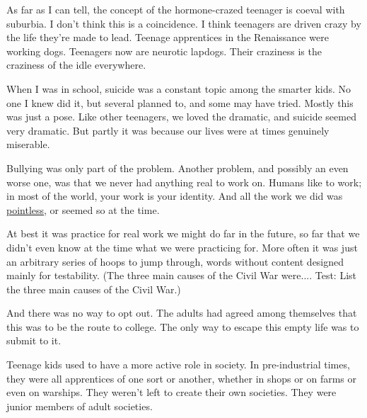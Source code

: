 As far as I can tell, the concept of
                  the hormone-crazed teenager is coeval with suburbia. I don't
                  think this is a coincidence. I think teenagers are driven
                  crazy by the life they're made to lead. Teenage apprentices in
                  the Renaissance were working dogs. Teenagers now are neurotic
                  lapdogs. Their craziness is the craziness of the idle
                  everywhere.




                  When I was in school, suicide was a constant topic among the
                  smarter kids. No one I knew did it, but several planned to,
                  and some may have tried. Mostly this was just a pose. Like
                  other teenagers, we loved the dramatic, and suicide seemed
                  very dramatic. But partly it was because our lives were at
                  times genuinely miserable.

Bullying was only part
                  of the problem. Another problem, and possibly an even worse
                  one, was that we never had anything real to work on. Humans
                  like to work; in most of the world, your work is your
                  identity. And all the work we did was
                  \href{http://www.paulgraham.com/essay.html}{pointless}, or seemed so at the
                  time.

At best it was practice for real work we
                  might do far in the future, so far that we didn't even know at
                  the time what we were practicing for. More often it was just
                  an arbitrary series of hoops to jump through, words without
                  content designed mainly for testability. (The three main
                  causes of the Civil War were.... Test: List the three main
                  causes of the Civil War.)

And there was no way to
                  opt out. The adults had agreed among themselves that this was
                  to be the route to college. The only way to escape this empty
                  life was to submit to it.




                  Teenage kids used to have a more active role in society. In
                  pre-industrial times, they were all apprentices of one sort or
                  another, whether in shops or on farms or even on warships.
                  They weren't left to create their own societies. They were
                  junior members of adult societies.

